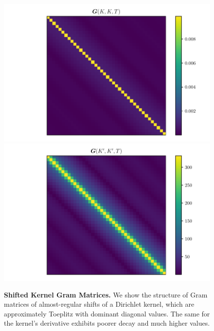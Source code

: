 \documentclass[11pt]{article}
\begin{document}
\begin{figure}[!h]
    \begin{center}
        \hspace{-3.5cm}
        \includegraphics[trim={0 0 0 0},scale=0.5]{../img/kernel-gram.pdf}
        \includegraphics[trim={1cm 0 5cm 0},scale=0.5]{../img/kernel-derivative-gram.pdf}
    \end{center}
    \vspace{-0.75cm}
    \caption{\textbf{Shifted Kernel Gram Matrices.} We show the structure of Gram matrices of almost-regular shifts of a Dirichlet kernel, which are approximately Toeplitz with dominant diagonal values.
      The same for the kernel's derivative exhibits poorer decay and much higher values.}
    \label{fig:gram-matrices}
\end{figure}

\clearpage

\nocite{*}


\end{document}
